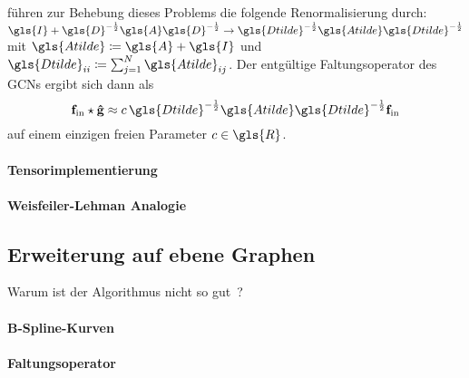 \citeauthor{gcn} führen zur Behebung dieses Problems die folgende Renormalisierung durch: $\gls{I} + \gls{D}^{-\frac{1}{2}} \gls{A} \gls{D}^{-\frac{1}{2}} \rightarrow \gls{Dtilde}^{-\frac{1}{2}} \gls{Atilde} \gls{Dtilde}^{-\frac{1}{2}}$ mit $\gls{Atilde} \coloneqq \gls{A} + \gls{I}$ und $\gls{Dtilde}_{ii} \coloneqq \sum_{j=1}^N \gls{Atilde}_{ij}$.
Der entgültige Faltungsoperator des \glspl{GCN} ergibt sich dann als
\begin{equation*}
  \ve{f}_{\mathrm{in}} \star \ve{\hat g} \approx c\, \gls{Dtilde}^{-\frac{1}{2}} \gls{Atilde} \gls{Dtilde}^{-\frac{1}{2}} \ve{f}_{\mathrm{in}}
\end{equation*}
auf einem einzigen freien Parameter $c \in \gls{R}$.

\paragraph{Tensorimplementierung}
\label{gcn_tensor}

\paragraph{Weisfeiler-Lehman Analogie}
\label{weisfeiler_lehman_analogie}

\subsection{Erweiterung auf ebene Graphen}
\label{gcn_erweiterung}

Warum ist der Algorithmus nicht so gut~\cite{gcn_review}?

\paragraph{B-Spline-Kurven}
\label{bspline}

\paragraph{Faltungsoperator}
\label{ebener_faltungsoperator}
